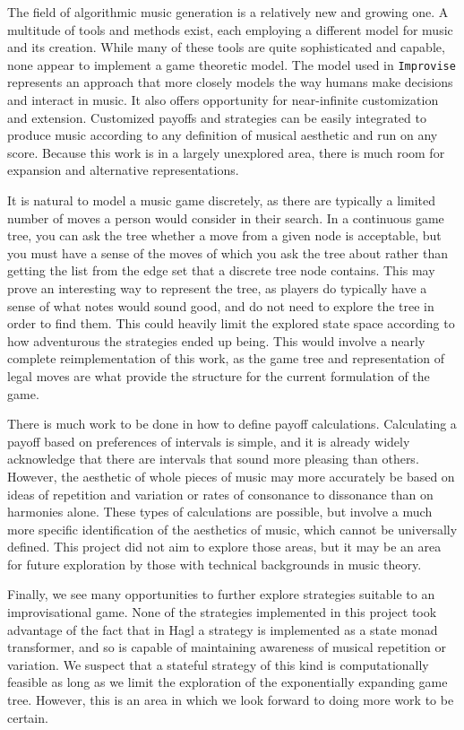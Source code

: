 \documentclass{article}
\begin{document}
The field of algorithmic music generation is a relatively new and
growing one. A multitude of tools and methods exist, each employing a
different model for music and its creation. While many of these tools
are quite sophisticated and capable, none appear to implement a game
theoretic model. The model used in \texttt{Improvise} represents an approach
that more closely models the way humans make decisions and interact in
music. It also offers opportunity for near-infinite customization and
extension. Customized payoffs and strategies can be easily integrated to
produce music according to any definition of musical aesthetic and run
on any score. Because this work is in a largely unexplored area, there
is much room for expansion and alternative representations.

It is natural to model a music game discretely, as there are
typically a limited number of moves a person would consider in their
search. In a continuous game tree, you can ask the tree
whether a move from a given node is acceptable, but you must have a
sense of the moves of which you ask the tree about rather than getting
the list from the edge set that a discrete tree node contains. This may
prove an interesting way to represent the tree, as players do typically
have a sense of what notes would sound good, and do not need to explore
the tree in order to find them. This could heavily limit the explored
state space according to how adventurous the strategies ended up being.
This would involve a nearly complete reimplementation of this work,
as the game tree and representation of legal moves are what provide the
structure for the current formulation of the game.

There is much work to be done in how to define payoff calculations. 
Calculating a payoff based on preferences of intervals is
simple, and it is already widely acknowledge that there are intervals
that sound more pleasing than others. However, the aesthetic of whole 
pieces of music may more accurately be based on ideas of repetition and
variation or rates of consonance to dissonance than on harmonies alone.
These types of calculations are possible, but involve a much more
specific identification of the aesthetics of music, which cannot be 
universally defined. This project did not aim to explore those areas, but it 
may be an area for future exploration by those with technical
backgrounds in music theory.

Finally, we see many opportunities to further explore strategies suitable to an 
improvisational game.  None of the strategies implemented in this project 
took advantage of the fact that in Hagl a strategy is implemented as a state 
monad transformer, and so is capable of maintaining awareness of musical  
repetition or variation. We suspect that a stateful strategy of this kind
is computationally feasible as long as we limit the exploration of the 
exponentially expanding game tree.  However, this is an area in which we 
look forward to doing more work to be certain.
\end{document}
